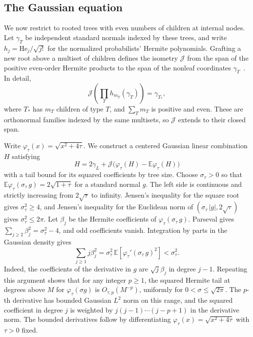 \documentclass[11pt,letterpaper]{article}
\newcommand{\E}{\mathbb E}
\newcommand{\abs}[1]{\lvert #1\rvert}
\begin{document}
\subsection{The Gaussian equation}

We now restrict to rooted trees with even numbers of children at
internal nodes. Let \(\gamma_T\) be independent standard normals
indexed by these trees, and write \(h_j=\mathrm{He}_j/\sqrt{j!}\) for
the normalized probabilists' Hermite polynomials. Grafting a new
root above a multiset of children defines the isometry \(\mathcal J\)
from the span of the positive even-order Hermite products to the
span of the nonleaf coordinates \(\gamma_T\)~\cite{CHHWY}. In detail,
\[
 \mathcal J\!\left(\prod_T h_{m_T}(\gamma_T)\right)=\gamma_{T_*},
\]
where \(T_*\) has \(m_T\) children of type \(T\), and \(\sum_T m_T\) is
positive and even. These are orthonormal families indexed by the
same multisets, so \(\mathcal J\) extends to their closed span.

Write \(\varphi_\tau(x)=\sqrt{x^2+4\tau}\). We construct a centered
Gaussian linear combination \(H\) satisfying
\begin{equation}\label{eq:gauss}
 H=2\gamma_L+\mathcal J\bigl(\varphi_\tau(H)-\E\varphi_\tau(H)\bigr)
\end{equation}
with a tail bound for its squared coefficients by tree size.
Choose \(\sigma_\tau>0\) so that \(\E\varphi_\tau(\sigma_\tau\,g)=2\sqrt{1+\tau}\)
for a standard normal \(g\). The left side is continuous and strictly
increasing from \(2\sqrt\tau\) to infinity. Jensen's inequality for
the square root gives \(\sigma_\tau^2\ge4\), and Jensen's inequality for the
Euclidean norm of \((\sigma_\tau\,\abs g, 2\sqrt\tau)\) gives \(\sigma_\tau^2\le2\pi\).
Let \(\beta_j\) be the Hermite coefficients of
\(\varphi_\tau(\sigma_\tau\,g)\). Parseval gives
\(\sum_{j\ge2}\beta_j^2=\sigma_\tau^2-4\), and odd coefficients vanish.
Integration by parts in the Gaussian density gives
\begin{equation}\label{eq:hermite-energy}
 \sum_{j\ge1} j\beta_j^2=\sigma_\tau^2\,\E\!\left[\varphi_\tau'(\sigma_\tau\,g)^2\right]<\sigma_\tau^2.
\end{equation}
Indeed, the coefficients of the derivative in \(g\) are
\(\sqrt{j}\beta_j\) in degree \(j-1\). Repeating this argument shows
that for any integer \(p\ge1\), the squared Hermite tail at degrees
above \(M\) for \(\varphi_\tau(\sigma g)\) is \(O_{\tau,p}(M^{-p})\),
uniformly for \(0<\sigma\le\sqrt{2\pi}\). The \(p\)-th derivative has bounded
Gaussian \(L^2\) norm on this range, and the squared coefficient in
degree \(j\) is weighted by \(j(j-1)\cdots(j-p+1)\) in the derivative
norm. The bounded derivatives follow by differentiating
\(\varphi_\tau(x)=\sqrt{x^2+4\tau}\) with \(\tau>0\) fixed.
\end{document}
